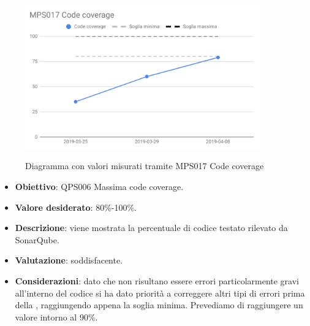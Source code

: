 	\begin{figure}[H]
		\centering
		\includegraphics[width=0.9\textwidth]{img/cruscotti/RQ/MPS017.png}
		\label{immagineCodeCoverageRQ}
		\caption{Diagramma con valori misurati tramite MPS017 Code coverage}
	\end{figure}
	
	\begin{itemize}
		\item \textbf{Obiettivo}: QPS006 Massima code coverage.
		\item \textbf{Valore desiderato}: 80\%-100\%.
		\item \textbf{Descrizione}: viene mostrata la percentuale di codice testato rilevato da SonarQube.
		\item \textbf{Valutazione}: soddisfacente.
		\item \textbf{Considerazioni}: dato che non risultano essere errori particolarmente gravi all'interno del codice si ha dato priorità a correggere altri tipi di errori prima della \RQ, raggiungendo appena la soglia minima.
		Prevediamo di raggiungere un valore intorno al 90\%.
	\end{itemize}


